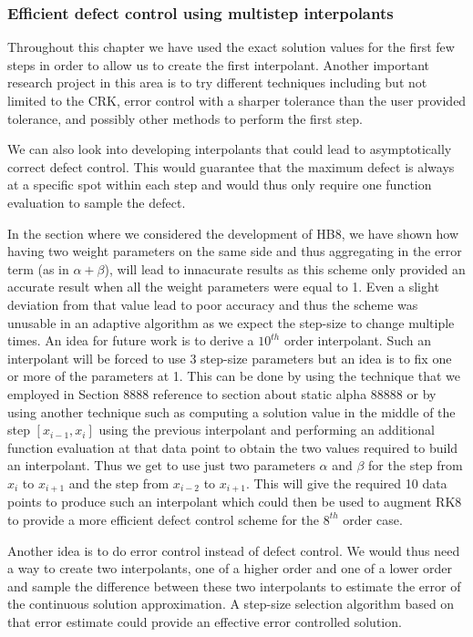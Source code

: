 \documentclass{article}
\begin{document}
\subsubsection{Efficient defect control using multistep interpolants}
Throughout this chapter we have used the exact solution values for the first few steps in order to allow us to create the first interpolant. Another important research project in this area is to try different techniques including but not limited to the CRK, error control with a sharper tolerance than the user provided tolerance, and possibly other methods to perform the first step.

We can also look into developing interpolants that could lead to asymptotically correct defect control. This would guarantee that the maximum defect is always at a specific spot within each step and would thus only require one function evaluation to sample the defect.

In the section where we considered the development of HB8, we have shown how having two weight parameters on the same side and thus aggregating in the error term (as in $\alpha + \beta$), will lead to innacurate results as this scheme only provided an accurate result when all the weight parameters were equal to 1. Even a slight deviation from that value lead to poor accuracy and thus the scheme was unusable in an adaptive algorithm as we expect the step-size to change multiple times. An idea for future work is to derive a $10^{th}$ order interpolant. Such an interpolant will be forced to use 3 step-size parameters but an idea is to fix one or more of the parameters at 1. This can be done by using the technique that we employed in Section 8888 reference to section about static alpha 88888 or by using another technique such as computing a solution value in the middle of the step $[x_{i-1}, x_i]$ using the previous interpolant and performing an additional function evaluation at that data point to obtain the two values required to build an interpolant. Thus we get to use just two parameters $\alpha$ and $\beta$ for the step from $x_i$ to $x_{i+1}$ and the step from $x_{i-2}$ to $x_{i+1}$.  This will give the required 10 data points to produce such an interpolant which could then be used to augment RK8 to provide a more efficient defect control scheme for the $8^{th}$ order case. 

Another idea is to do error control instead of defect control. We would thus need a way to create two interpolants, one of a higher order and one of a lower order and sample the difference between these two interpolants to estimate the error of the continuous solution approximation. A step-size selection algorithm based on that error estimate could provide an effective error controlled solution.
\end{document}
